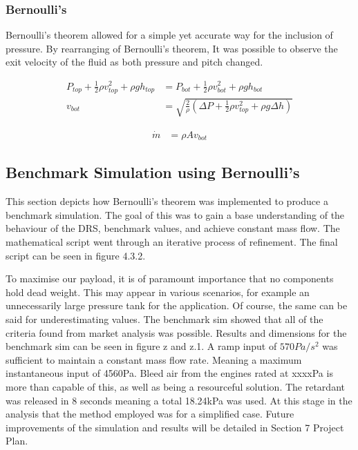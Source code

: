 \subsubsection{Bernoulli's}
Bernoulli’s theorem allowed for a simple yet accurate way for the inclusion of pressure. By rearranging of Bernoulli’s theorem, It was possible to observe the exit velocity of the fluid as both pressure and pitch changed.


\begin{equation}
\begin{split}
  P_{top} + \frac{1}{2} \rho v^{2}_{top} + \rho g h_{top} & = P_{bot} + \frac{1}{2} \rho v^{2}_{bot} + \rho g h_{bot} \\ 
  v_{bot} & = \sqrt{\frac{2}{\rho}( \Delta P + \frac{1}{2} \rho v^{2}_{top} + \rho g \Delta h)}
\end{split}
\label{eqn:bernouli_rearanged}
\end{equation}

\begin{equation}
\begin{split}
  \dot{m} & = \rho A v_{bot}
\end{split}
\label{eqn:mass_flow}
\end{equation}

\subsection{Benchmark Simulation using Bernoulli's}
This section depicts how Bernoulli’s theorem was implemented to produce a benchmark simulation. The goal of this was to gain a base understanding of the behaviour of the DRS, benchmark values, and achieve constant mass flow. The mathematical script went through an iterative process of refinement. The final script can be seen in figure 4.3.2.



To maximise our payload, it is of paramount importance that no components hold dead weight. This may appear in various scenarios, for example an unnecessarily large pressure tank for the application. Of course, the same can be said for underestimating values. 
The benchmark sim showed that all of the criteria found from market analysis was possible. Results and dimensions for the benchmark sim can be seen in figure z and z.1. A ramp input of $570 Pa/s^{2}$ was sufficient to maintain a constant mass flow rate. Meaning a maximum instantaneous input of 4560Pa. Bleed air from the engines rated at xxxxPa is more than capable of this, as well as being a resourceful solution. The retardant was released in 8 seconds meaning a total 18.24kPa was used. At this stage in the analysis that the method employed was for a simplified case. Future improvements of the simulation and results will be detailed in Section 7 Project Plan.

